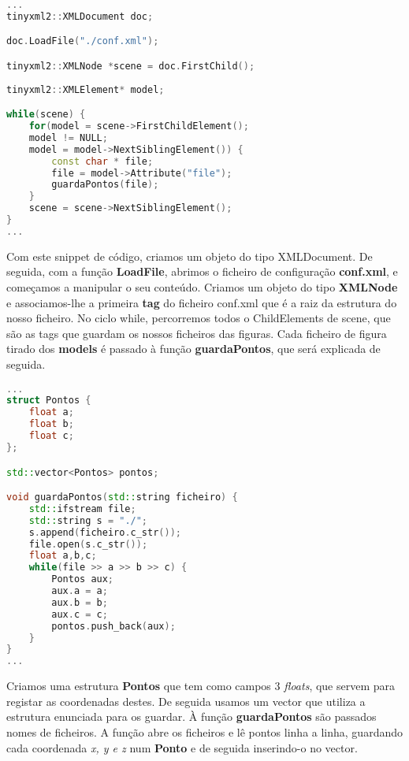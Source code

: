 \documentclass{article}
\begin{document}
\begin{file}
	\begin{lstlisting}[language=C++]
...
tinyxml2::XMLDocument doc;

doc.LoadFile("./conf.xml");

tinyxml2::XMLNode *scene = doc.FirstChild();
		
tinyxml2::XMLElement* model;

while(scene) {
	for(model = scene->FirstChildElement();
	model != NULL; 
	model = model->NextSiblingElement()) {
		const char * file;
		file = model->Attribute("file");
		guardaPontos(file);
	}
	scene = scene->NextSiblingElement();
}
...

	\end{lstlisting}
\end{file}

Com este snippet de código, criamos um objeto do tipo XMLDocument. De seguida, com a função \textbf{LoadFile}, abrimos o ficheiro de configuração \textbf{conf.xml}, e começamos a manipular o seu conteúdo.
Criamos um objeto do tipo \textbf{XMLNode} e associamos-lhe a primeira \textbf{tag} do ficheiro conf.xml que é a raiz da estrutura do nosso ficheiro.
No ciclo while, percorremos todos o ChildElements de scene, que são as tags que guardam os nossos ficheiros das figuras.
Cada ficheiro de figura tirado dos \textbf{models} é passado à função \textbf{guardaPontos}, que será explicada de seguida.

\begin{file}
	\begin{lstlisting}[language=C++]
...
struct Pontos {
    float a;
    float b;
    float c;
};

std::vector<Pontos> pontos;

void guardaPontos(std::string ficheiro) {
	std::ifstream file;
	std::string s = "./";
	s.append(ficheiro.c_str());
	file.open(s.c_str());
	float a,b,c;
	while(file >> a >> b >> c) {
		Pontos aux;
		aux.a = a;
		aux.b = b;
		aux.c = c;
		pontos.push_back(aux);
	}
}
...
	\end{lstlisting}
\end{file}

Criamos uma estrutura \textbf{Pontos} que tem como campos 3 \textit{floats}, que servem para registar as coordenadas destes. De seguida usamos um vector que utiliza a estrutura enunciada para os guardar.
À função \textbf{guardaPontos} são passados nomes de ficheiros. A função abre os ficheiros e lê pontos linha a linha, guardando cada coordenada \textit{x, y e z} num \textbf{Ponto} e de seguida inserindo-o no vector.
\end{document}
